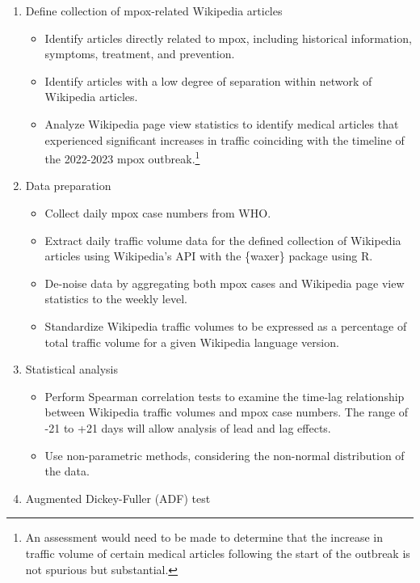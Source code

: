 \documentclass[
  12pt,
]{article}
\providecommand{\tightlist}{%
  \setlength{\itemsep}{0pt}\setlength{\parskip}{0pt}}\usepackage{longtable,booktabs,array}
\begin{document}
\begin{enumerate}
\def\labelenumi{\arabic{enumi}.}
\tightlist
\item
  Define collection of mpox-related Wikipedia articles

  \begin{itemize}
  \tightlist
  \item
    Identify articles directly related to mpox, including historical
    information, symptoms, treatment, and prevention.
  \item
    Identify articles with a low degree of separation within network of
    Wikipedia articles.
  \item
    Analyze Wikipedia page view statistics to identify medical articles
    that experienced significant increases in traffic coinciding with
    the timeline of the 2022-2023 mpox outbreak.\footnote{An assessment
      would need to be made to determine that the increase in traffic
      volume of certain medical articles following the start of the
      outbreak is not spurious but substantial.}
  \end{itemize}
\item
  Data preparation

  \begin{itemize}
  \tightlist
  \item
    Collect daily mpox case numbers from WHO.
  \item
    Extract daily traffic volume data for the defined collection of
    Wikipedia articles using Wikipedia's API with the \{waxer\} package
    using R.
  \item
    De-noise data by aggregating both mpox cases and Wikipedia page view
    statistics to the weekly level.
  \item
    Standardize Wikipedia traffic volumes to be expressed as a
    percentage of total traffic volume for a given Wikipedia language
    version.
  \end{itemize}
\item
  Statistical analysis

  \begin{itemize}
  \tightlist
  \item
    Perform Spearman correlation tests to examine the time-lag
    relationship between Wikipedia traffic volumes and mpox case
    numbers. The range of -21 to +21 days will allow analysis of lead
    and lag effects.
  \item
    Use non-parametric methods, considering the non-normal distribution
    of the data.
  \end{itemize}
\item
  Augmented Dickey-Fuller (ADF) test


\end{enumerate}
\end{document}
